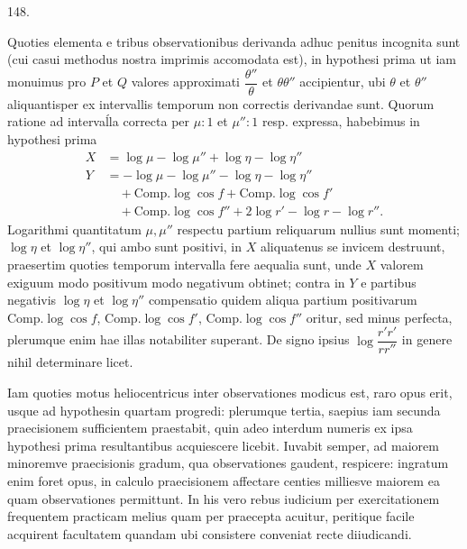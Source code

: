 \par{}\medskip
\begin{center}\hypertarget{native-198-article148}{}148.\end{center}
Quoties elementa e tribus observationibus derivanda adhuc penitus incognita
sunt (cui casui methodus nostra imprimis accomodata est), in hypothesi
prima ut iam monuimus pro $P$ et $Q$ valores approximati $\dfrac{\theta''}{\theta}$ et $\theta\theta''$
accipientur, ubi $\theta$ et $\theta''$ aliquantisper ex intervallis temporum non correctis
derivandae sunt. Quorum ratione ad interva\'{l}la correcta per $\mu:1$ et $\mu'':1$
resp. expressa, habebimus in hypothesi prima
\[
\begin{aligned}
X&=\log\mu-\log\mu''+\log\eta-\log\eta''\\
Y&=-\log\mu-\log\mu''-\log\eta-\log\eta''\\
&\quad+\mathrm{Comp.}\log\cos f+\mathrm{Comp.}\log\cos f'\\
&\quad+\mathrm{Comp.}\log\cos f''+2\log r'-\log r-\log r''.
\end{aligned}
\]
Logarithmi quantitatum $\mu,\mu''$ respectu partium reliquarum nullius sunt momenti;
$\log\eta$ et $\log\eta''$, qui ambo sunt positivi, in $X$ aliquatenus se invicem
destruunt, praesertim quoties temporum intervalla fere aequalia sunt, unde
$X$ valorem exiguum modo positivum modo negativum obtinet; contra in $Y$ e
partibus negativis $\log\eta$ et $\log\eta''$ compensatio quidem aliqua partium positivarum
$\mathrm{Comp.}\log\cos f$, $\mathrm{Comp.}\log\cos f'$, $\mathrm{Comp.}\log\cos f''$ oritur, sed minus perfecta,
plerumque enim hae illas notabiliter superant. De signo ipsius $\log\dfrac{r'r'}{rr''}$ in genere
nihil determinare licet.

Iam quoties motus heliocentricus inter observationes modicus est, raro
opus erit, usque ad hypothesin quartam progredi: plerumque tertia, saepius
iam secunda praecisionem sufficientem praestabit, quin adeo interdum numeris
ex ipsa hypothesi prima resultantibus acquiescere licebit. Iuvabit semper, ad
maiorem minoremve praecisionis gradum, qua observationes gaudent, respicere:
ingratum enim foret opus, in calculo praecisionem affectare centies milliesve
maiorem ea quam observationes permittunt. In his vero rebus iudicium per
exercitationem frequentem practicam melius quam per praecepta acuitur, peritique
facile acquirent facultatem quandam ubi consistere conveniat recte diiudicandi.
